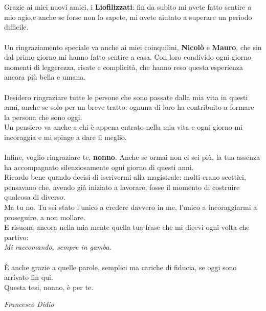 \\\\
Grazie ai miei nuovi amici, i \textbf{Liofilizzati}: fin da subito mi avete fatto sentire a mio agio,e anche se forse non lo sapete, mi avete aiutato a superare un periodo difficile.
\\\\
Un ringraziamento speciale va anche ai miei coinquilini, \textbf{Nicolò} e \textbf{Mauro}, che sin dal primo giorno mi hanno fatto sentire a casa. Con loro condivido ogni giorno momenti di leggerezza, risate e complicità, che hanno reso questa esperienza ancora più bella e umana.
\\\\
Desidero ringraziare tutte le persone che sono passate dalla mia vita in questi anni, anche se solo per un breve tratto: ognuna di loro ha contribuito a formare la persona che sono oggi.
\\
Un pensiero va anche a chi è appena entrato nella mia vita e ogni giorno mi incoraggia e mi spinge a dare il meglio.
\\\\
Infine, voglio ringraziare te, \textbf{nonno}. Anche se ormai non ci sei più, la tua assenza ha accompagnato silenziosamente ogni giorno di questi anni.\\
Ricordo bene quando decisi di iscrivermi alla magistrale: molti erano scettici, pensavano che, avendo già iniziato a lavorare, fosse il momento di costruire qualcosa di diverso.\\
Ma tu no. Tu sei stato l'unico a credere davvero in me, l'unico a incoraggiarmi a proseguire, a non mollare.\\
E risuona ancora nella mia mente quella tua frase che mi dicevi ogni volta che partivo:\\
\textit{Mi raccomando, sempre in gamba.}
\\\\
È anche grazie a quelle parole, semplici ma cariche di fiducia, se oggi sono arrivato fin qui.
\\
Questa tesi, nonno, è per te.
\vspace*{\fill}
\begin{flushright}
\textit{Francesco Didio}
\end{flushright}